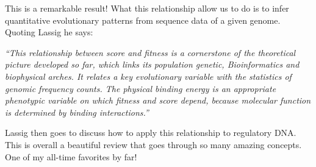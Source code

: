 This is a remarkable result! What this relationship allow us to do is to infer
quantitative evolutionary patterns from sequence data of a given genome. Quoting
Lassig he says:

{\it  ``This relationship between score and fitness is a cornerstone of the
theoretical picture developed so far, which links its population genetic,
Bioinformatics and biophysical arches. It relates a key evolutionary variable
with the statistics of genomic frequency counts. The physical binding energy is
an appropriate phenotypic variable on which fitness and score depend, because
molecular function is determined by binding interactions.''}

Lassig then goes to discuss how to apply this relationship to regulatory DNA.
This is overall a beautiful review that goes through so many amazing concepts.
One of my all-time favorites by far!
